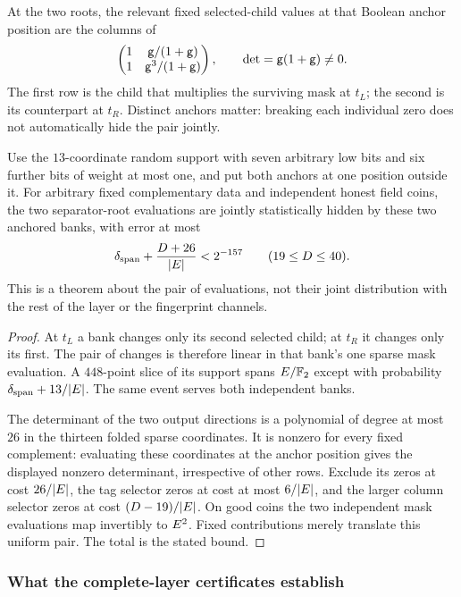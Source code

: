 At the two roots, the relevant fixed selected-child values at that Boolean anchor position are the columns of
\[
 \begin{pmatrix}
 1&\mathsf{g}/(1+\mathsf{g})\\
 1&\mathsf{g}^3/(1+\mathsf{g})
 \end{pmatrix},
 \qquad \det=\mathsf{g}(1+\mathsf{g})\ne0.
\]
The first row is the child that multiplies the surviving mask at $t_L$; the second is its counterpart at $t_R$. Distinct anchors matter: breaking each individual zero does not automatically hide the pair jointly.

\begin{theorem}
Use the $13$-coordinate random support with seven arbitrary low bits and six further bits of weight at most one, and put both anchors at one position outside it. For arbitrary fixed complementary data and independent honest field coins, the two separator-root evaluations are jointly statistically hidden by these two anchored banks, with error at most
\[
 \delta_{\mathrm{span}}+\frac{D+26}{|E|}<2^{-157}
 \qquad(19\le D\le40).
\]
This is a theorem about the pair of evaluations, not their joint distribution with the rest of the layer or the fingerprint channels.
\end{theorem}
\begin{proof}
At $t_L$ a bank changes only its second selected child; at $t_R$ it changes only its first. The pair of changes is therefore linear in that bank's one sparse mask evaluation. A $448$-point slice of its support spans $E/\mathbb{F}_2$ except with probability $\delta_{\mathrm{span}}+13/|E|$. The same event serves both independent banks.

The determinant of the two output directions is a polynomial of degree at most $26$ in the thirteen folded sparse coordinates. It is nonzero for every fixed complement: evaluating these coordinates at the anchor position gives the displayed nonzero determinant, irrespective of other rows. Exclude its zeros at cost $26/|E|$, the tag selector zeros at cost at most $6/|E|$, and the larger column selector zeros at cost $(D-19)/|E|$. On good coins the two independent mask evaluations map invertibly to $E^2$. Fixed contributions merely translate this uniform pair. The total is the stated bound.
\end{proof}

\subsubsection{What the complete-layer certificates establish}

